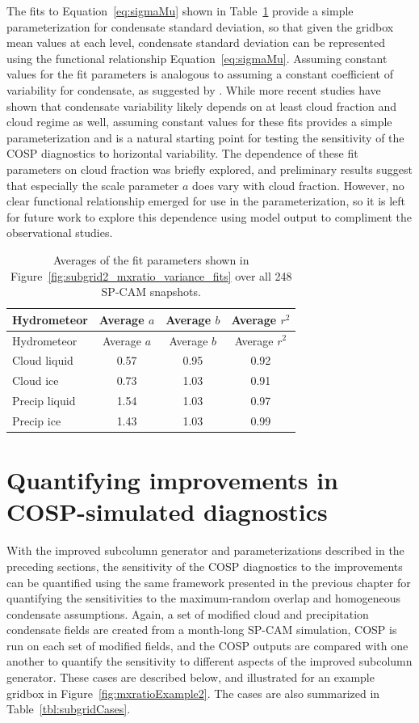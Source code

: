 The fits to Equation~\ref{eq:sigmaMu} shown in
Table~\ref{tbl:subgrid2_mxratio_variance_fits_table} provide a simple
parameterization for condensate standard deviation, so that given the
gridbox mean values at each level, condensate standard deviation can be
represented using the functional relationship Equation~\ref{eq:sigmaMu}.
Assuming constant values for the fit parameters is analogous to assuming
a constant coefficient of variability for condensate, as suggested by
\citet{shonk_et_al_2010}. While more recent studies have shown that
condensate variability likely depends on at least cloud fraction and
cloud regime as well, assuming constant values for these fits provides a
simple parameterization and is a natural starting point for testing the
sensitivity of the COSP diagnostics to horizontal variability. The
dependence of these fit parameters on cloud fraction was briefly
explored, and preliminary results suggest that especially the scale
parameter \(a\) does vary with cloud fraction. However, no clear
functional relationship emerged for use in the parameterization, so it
is left for future work to explore this dependence using model output to
compliment the observational studies.

\begin{longtable}[]{@{}lccc@{}}
\caption{\label{tbl:subgrid2_mxratio_variance_fits_table}Averages of the
fit parameters shown in Figure~\ref{fig:subgrid2_mxratio_variance_fits}
over all 248 SP-CAM snapshots. }\tabularnewline
\toprule
Hydrometeor & Average \(a\) & Average \(b\) & Average
\(r^2\)\tabularnewline
\midrule
\endfirsthead
\toprule
Hydrometeor & Average \(a\) & Average \(b\) & Average
\(r^2\)\tabularnewline
\midrule
\endhead
Cloud liquid & 0.57 & 0.95 & 0.92\tabularnewline
Cloud ice & 0.73 & 1.03 & 0.91\tabularnewline
Precip liquid & 1.54 & 1.03 & 0.97\tabularnewline
Precip ice & 1.43 & 1.03 & 0.99\tabularnewline
\bottomrule
\end{longtable}

\section{Quantifying improvements in COSP-simulated
diagnostics}\label{sec:subgrid2Results}

With the improved subcolumn generator and parameterizations described in
the preceding sections, the sensitivity of the COSP diagnostics to the
improvements can be quantified using the same framework presented in the
previous chapter for quantifying the sensitivities to the maximum-random
overlap and homogeneous condensate assumptions. Again, a set of modified
cloud and precipitation condensate fields are created from a month-long
SP-CAM simulation, COSP is run on each set of modified fields, and the
COSP outputs are compared with one another to quantify the sensitivity
to different aspects of the improved subcolumn generator. These cases
are described below, and illustrated for an example gridbox in
Figure~\ref{fig:mxratioExample2}. The cases are also summarized in
Table~\ref{tbl:subgridCases}.

